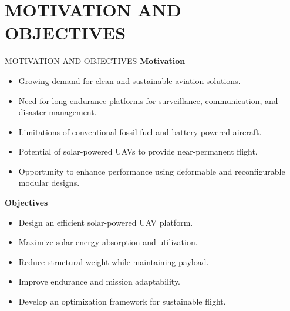 \documentclass{beamer}
\begin{document}
\section{MOTIVATION AND OBJECTIVES}
\begin{frame}{MOTIVATION AND OBJECTIVES}
    \textbf{Motivation}
    \begin{itemize}
        \item Growing demand for clean and sustainable aviation solutions.
        \item Need for long-endurance platforms for surveillance, communication, and disaster management.
        \item Limitations of conventional fossil-fuel and battery-powered aircraft.
        \item Potential of solar-powered UAVs to provide near-permanent flight.
        \item Opportunity to enhance performance using deformable and reconfigurable modular designs.
    \end{itemize}
    
    \vspace{0.3cm}
    
    \textbf{Objectives}
    \begin{itemize}
        \item Design an efficient solar-powered UAV platform.
        \item Maximize solar energy absorption and utilization.
        \item Reduce structural weight while maintaining payload.
        \item Improve endurance and mission adaptability.
        \item Develop an optimization framework for sustainable flight.
    \end{itemize}
\end{frame}
\end{document}
